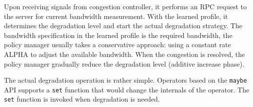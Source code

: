  Upon receiving signals from congestion controller, it
performs an RPC request to the server for current bandwidth measurement. With
the learned profile, it determines the degradation level and start the actual
degradation strategy. The bandwidth specification in the learned profile is the
required bandwidth, the policy manager usually takes a conservative approach:
using a constant rate ALPHA to adjust the available bandwidth. When the
congestion is resolved, the policy manager gradually reduce the degradation
level (additive increase phase).

 The actual degradation operation is rather simple. Operators
based on the \texttt{maybe} API supports a \texttt{set} function that would
change the internals of the operator. The \texttt{set} function is invoked when
degradation is needed.


